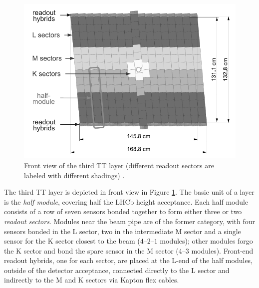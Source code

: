 \begin{figure}[t]
	\centering
	\includegraphics[width=.6\textwidth]{graphics/02-lhcb/TT_layout.png}
	\caption[Front view of the third TT layer.]{Front view of the third TT layer (different readout sectors are labeled with different shadings) \cite{Alves:1129809}.}
	\label{fig:2:TT}
\end{figure}

The third TT layer is depicted in front view in Figure \ref{fig:2:TT}.
The basic unit of a layer is the \textit{half module}, covering half the LHCb height acceptance.
Each half module consists of a row of seven sensors bonded together to form either three or two \textit{readout sectors}.
Modules near the beam pipe are of the former category, with four sensors bonded in the L sector, two in the intermediate M sector and a single sensor for the K sector closest to the beam ($4$--$2$--$1$ modules);
other modules forgo the K sector and bond the spare sensor in the M sector ($4$--$3$ modules).
Front-end readout hybrids, one for each sector, are placed at the L-end of the half modules, outside of the detector acceptance, connected directly to the L sector and indirectly to the M and K sectors via Kapton flex cables.

